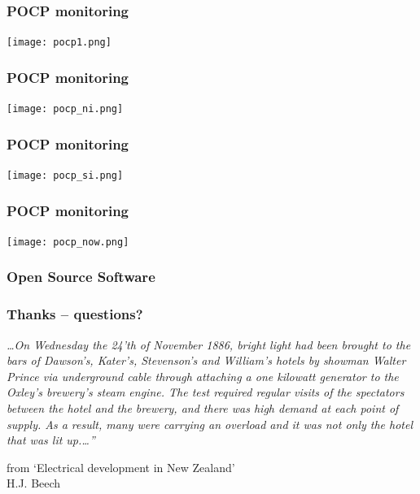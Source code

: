 \documentclass[aspectratio=169]{beamer}
\begin{document}
\frame
{\frametitle{POCP monitoring}
\begin{center}
\texttt{[image: pocp1.png]} 
\end{center}
}

\frame
{\frametitle{POCP monitoring}
\begin{center}
\texttt{[image: pocp\_ni.png]} 
\end{center}
}

\frame
{\frametitle{POCP monitoring}
\begin{center}
\texttt{[image: pocp\_si.png]} 
\end{center}
}

\frame
{\frametitle{POCP monitoring}
\begin{center}
\texttt{[image: pocp\_now.png]} 
\end{center}
}

\frame
{\frametitle{Open Source Software}

}

\frame
{\frametitle{Thanks -- questions?}

\emph{\ldots On Wednesday the 24'th of November 1886, bright light had been brought to the bars of Dawson's, Kater's, Stevenson's and William's hotels by showman Walter Prince via underground cable through attaching a one kilowatt generator to the Oxley's brewery's steam engine. The test required regular visits of the spectators between the hotel and the brewery, and there was high demand at each point of supply. As a result, many were carrying an overload and it was not only the hotel that was lit up.\ldots''}
\begin{flushright}
\scriptsize from `Electrical development in New Zealand' \\
H.J. Beech
\end{flushright}
}
\end{document}
